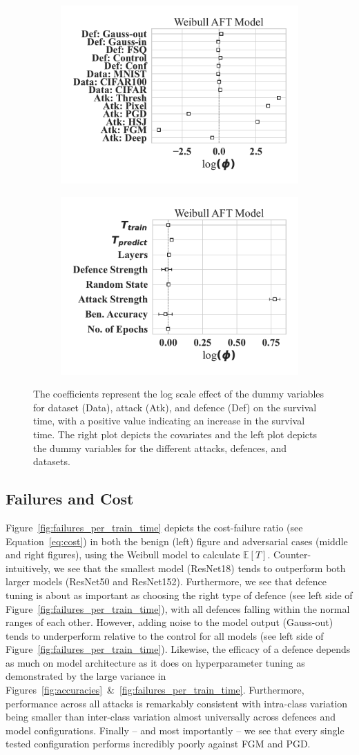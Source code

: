 \begin{figure}
    \centering
	\begin{subfigure}
	\centering
    \includegraphics[width=.35\textwidth]{plots/weibull_aft_dummies.pdf}
    \end{subfigure}
    \begin{subfigure}
	\centering
    \includegraphics[width=.35\textwidth]{plots/weibull_aft.pdf}
    \end{subfigure}
    \caption{The coefficients represent the log scale effect of the dummy variables for dataset (Data), attack (Atk), and defence (Def) on the survival time, with a positive value indicating an increase in the survival time. The right plot depicts the covariates and the left plot depicts the dummy variables for the different attacks, defences, and datasets.}
    \label{fig:covariates}
    \label{fig:dummies}
\end{figure}


\subsection{Failures and Cost}

Figure~\ref{fig:failures_per_train_time} depicts the cost-failure ratio (see Equation~\ref{eq:cost}) in both the benign (left) figure and adversarial cases (middle and right figures), using the Weibull model to calculate $\mathbb{E}[T]$. Counter-intuitively, we see that the smallest model (ResNet18) tends to outperform both larger models (ResNet50 and ResNet152). Furthermore, we see that defence tuning is about as important as choosing the right type of defence (see left side of Figure~\ref{fig:failures_per_train_time}), with all defences falling within the normal ranges of each other. However, adding noise to the model output (Gauss-out) tends to underperform relative to the control for all models (see left side of Figure~\ref{fig:failures_per_train_time}). Likewise, the efficacy of a defence depends as much on model architecture as it does on hyperparameter tuning as demonstrated by the large variance in Figures~\ref{fig:accuracies}~\&~\ref{fig:failures_per_train_time}.  Furthermore, performance across all attacks is remarkably consistent with intra-class variation being smaller than inter-class variation almost universally across defences and model configurations.
Finally -- and most importantly -- we see that every single tested configuration performs incredibly poorly against FGM and PGD\@.


